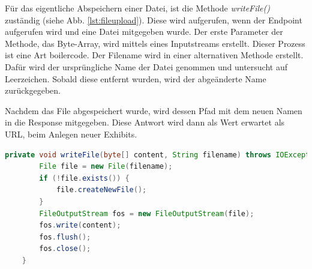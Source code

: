 Für das eigentliche Abspeichern einer Datei, ist die Methode \emph{writeFile()} zuständig (siehe Abb. \ref{lst:fileupload}). 
Diese wird aufgerufen, wenn der Endpoint aufgerufen wird und eine Datei mitgegeben wurde. 
Der erste Parameter der Methode, das Byte-Array, wird mittels eines Inputstreams erstellt. 
Dieser Prozess ist eine Art \gls{boilercode}.
Der Filename wird in einer alternativen Methode erstellt. 
Dafür wird der ursprüngliche Name der Datei genommen und untersucht auf Leerzeichen. 
Sobald diese entfernt wurden, wird der abgeänderte Name zurückgegeben. 

Nachdem das File abgespeichert wurde, wird dessen Pfad mit dem neuen Namen in die Response mitgegeben. 
Diese Antwort wird dann als Wert erwartet als URL, beim Anlegen neuer Exhibits. 


\begin{lstlisting}[label=lst:fileupload, language=Java, caption=Hochladen der Dateien]
    private void writeFile(byte[] content, String filename) throws IOException {
        File file = new File(filename);
        if (!file.exists()) {
            file.createNewFile();
        }
        FileOutputStream fos = new FileOutputStream(file);
        fos.write(content);
        fos.flush();
        fos.close();
    }
\end{lstlisting}
